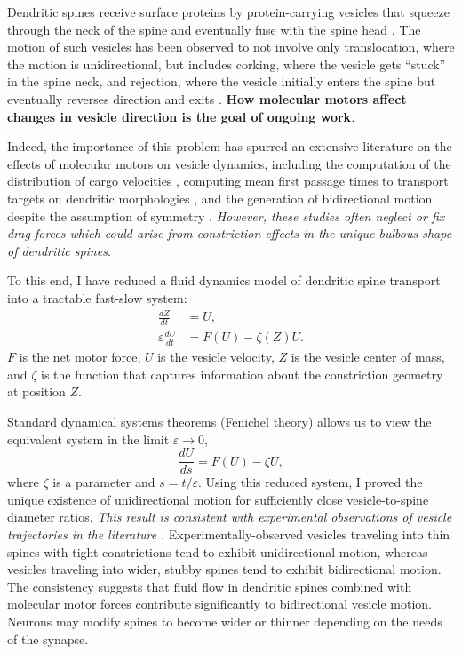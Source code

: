 \documentclass[a4paper,11pt]{article}
\newcommand{\ve}{\varepsilon}
\begin{document}
Dendritic spines receive surface proteins by protein-carrying vesicles that squeeze through the neck of the spine and eventually fuse with the spine head \cite{da2015positioning}. The motion of such vesicles has been observed to not involve only translocation, where the motion is unidirectional, but includes corking, where the vesicle gets ``stuck'' in the spine neck, and rejection, where the vesicle initially enters the spine but eventually reverses direction and exits \cite{park2006plasticity}. \textbf{How molecular motors affect changes in vesicle direction is the goal of ongoing work}.

Indeed, the importance of this problem has spurred an extensive literature on the effects of molecular motors on vesicle dynamics, including the computation of the distribution of cargo velocities \cite{kunwar2011mechanical}, computing mean first passage times to transport targets on dendritic morphologies \cite{bressloff2013metastability}, and the generation of bidirectional motion despite the assumption of symmetry \cite{portet2019deciphering}. \textit{However, these studies often neglect or fix drag forces which could arise from constriction effects in the unique bulbous shape of dendritic spines}.

To this end, I have reduced a fluid dynamics model of dendritic spine transport into a tractable fast-slow system:
\begin{equation}\label{eq:fs1}
\begin{split}
\frac{dZ}{dt} &= U,\\
\ve\frac{dU}{dt} &= F(U) - \zeta(Z) U.
\end{split}
\end{equation}
$F$ is the net motor force, $U$ is the vesicle velocity, $Z$ is the vesicle center of mass, and $\zeta$ is the function that captures information about the constriction geometry at position $Z$.

Standard dynamical systems theorems (Fenichel theory) allows us to view the equivalent system in the limit $\ve\rightarrow 0$,
\begin{equation*}
\frac{dU}{ds} = F(U) - \zeta U,
\end{equation*}
where $\zeta$ is a parameter and  $s=t/\ve$. Using this reduced system, I proved the unique existence of unidirectional motion for sufficiently close vesicle-to-spine diameter ratios. \textit{This result is consistent with experimental observations of vesicle trajectories in the literature \cite{park2020dynamics}}. Experimentally-observed vesicles traveling into thin spines with tight constrictions tend to exhibit unidirectional motion, whereas vesicles traveling into wider, stubby spines tend to exhibit bidirectional motion. The consistency suggests that fluid flow in dendritic spines combined with molecular motor forces contribute significantly to bidirectional vesicle motion. Neurons may modify spines to become wider or thinner depending on the needs of the synapse.
\end{document}
